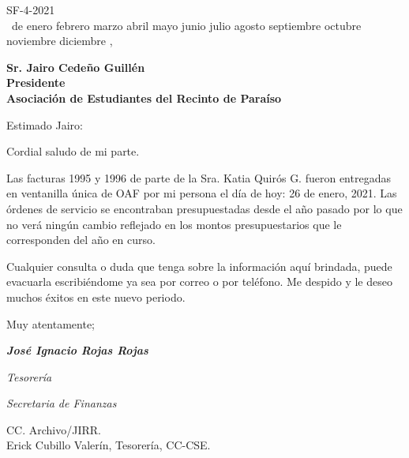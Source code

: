 \documentclass[12pt]{article}
\newcommand{\MONTH}{%
  \ifcase\the\month
  \or enero%
  \or febrero%
  \or marzo%
  \or abril%
  \or mayo%
  \or junio%
  \or julio%
  \or agosto%
  \or septiembre%
  \or octubre%
  \or noviembre%
  \or diciembre%
  \fi}
\begin{document}
\begin{flushright}
  SF-4-2021\\
  \medskip
  \the\day\ de \MONTH, \the\year
\end{flushright}
\medskip
\begin{flushleft}\begin{spacing}{1}
  \textbf{Sr. Jairo Cedeño Guillén\\
  Presidente\\
  Asociación de Estudiantes del Recinto de Paraíso}
\end{spacing}\end{flushleft}

\noindent Estimado Jairo:\par

Cordial saludo de mi parte.\par
Las facturas 1995 y 1996 de parte de la Sra. Katia Quirós G. fueron entregadas en ventanilla única de OAF por mi persona el día de hoy: 26 de enero, 2021. Las órdenes de servicio se encontraban presupuestadas desde el año pasado por lo que no verá ningún cambio reflejado en los montos presupuestarios que le corresponden del año en curso.\par 
Cualquier consulta o duda que tenga sobre la información aquí brindada, puede evacuarla escribiéndome ya sea por correo o por teléfono. Me despido y le deseo muchos éxitos en este nuevo periodo.\par
Muy atentamente;\par
\bigskip
\bigskip
\bigskip
\begin{spacing}{1}
\textit{\textbf{José Ignacio Rojas Rojas}}\par
\textit{Tesorería}\par
\textit{Secretaria de Finanzas}
\end{spacing}
\medskip
\begin{flushleft}\begin{spacing}{1}
 \scriptsize{CC. Archivo/JIRR.\\
 Erick Cubillo Valerín, Tesorería, CC-CSE.

 }
\end{spacing}\end{flushleft}
%
%
\end{document}
